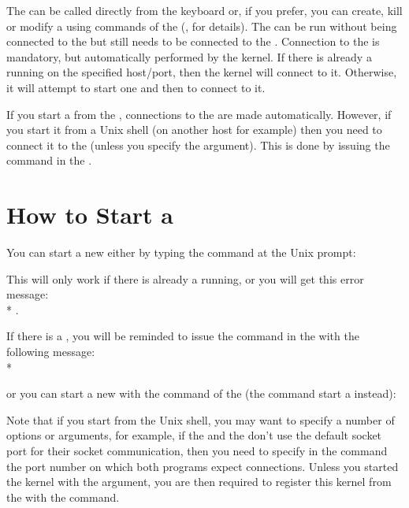 The \COPRS{} can be called directly from the keyboard or, if you prefer, you can
create, kill or modify a \CPK{} using commands of the \OPRSS{}
(, for details). The \CPK{} can be run
without being connected to the \OPRSS{} but still needs to be connected to
the \MPA{}. Connection to the \MPA{}  is mandatory, but  automatically performed by
the kernel. If there is already a \MPA{} running on the specified host/port,
then  the kernel will connect to it. Otherwise, it will attempt to start one
and then to connect to it.

If you start a \CPK{} from the \OPRSS{}, connections to the \OPRSS{}
are made automatically. However, if you start it from a Unix shell (on another
host for example) then you need to connect it to the \OPRSS{} (unless you
specify the  argument). This is done by issuing the 
command in the \OPRSS{}.

\section{How to Start a \CPK{}}


You can start a new \CPK{} either by typing the command 
at the Unix prompt:


This will only work if there is already a \OPRSS{} running, or you will get
this error message:\\* 
.

If there is a \OPRSS{}, you will be reminded to issue the 
command in the \OPRSS{} with the following message:\\*

or you can start a new \CPK{} with the  command of the \OPRSS{}
(the  command start a \XPK{} instead):


Note that if you start \COPRS{} from the Unix shell, you may want to specify a
number of options or arguments, for example, if the \OPRSS{} and the
\MPA{} don't use the default socket port for their socket communication,
then you need to specify in the  command the port number on which
both programs expect connections. Unless you started the kernel with the
 argument, you are then required to register this kernel from the
\OPRSS{} with the  command.

